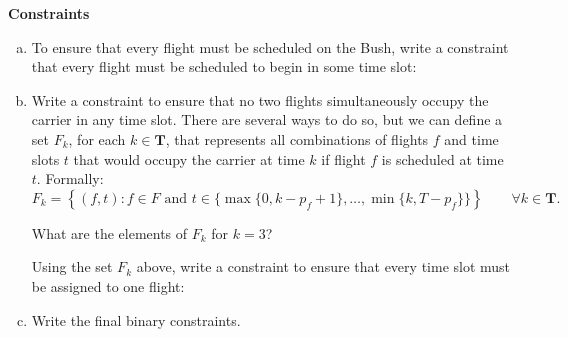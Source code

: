 \documentclass[11pt]{article}
\theoremstyle{definition}
\begin{document}
\newpage

\textbf{Constraints}
\begin{enumerate}[a.]
    \item To ensure that every flight must be scheduled on the Bush, write a constraint that every flight must be scheduled to begin in some time slot:

    

    \vfill
    \item Write a constraint to ensure that no two flights simultaneously occupy the carrier in any time slot. There are several ways to do so, but we can define a set $F_k$, for each $k \in \boldsymbol{T}$, that represents all combinations of flights $f$ and time slots $t$ that would occupy the carrier at time $k$ if flight $f$ is scheduled at time $t$. Formally:
\begin{equation*} \label{e:basics2}
F_k = \left\{(f,t): f \in F \textrm{ and }  t \in \{\max\{0,k - p_f + 1\},\ldots,\min\{k,T-p_f\}\}\right\} \qquad \forall k \in \boldsymbol{T}.
\end{equation*}

What are the elements of $F_k$ for $k = 3$? \vfill

Using the set $F_k$ above, write a constraint to ensure that every time slot must be assigned to one flight:

\vfill
\item Write the final binary constraints.
\vfill
\end{enumerate}










\end{document}
